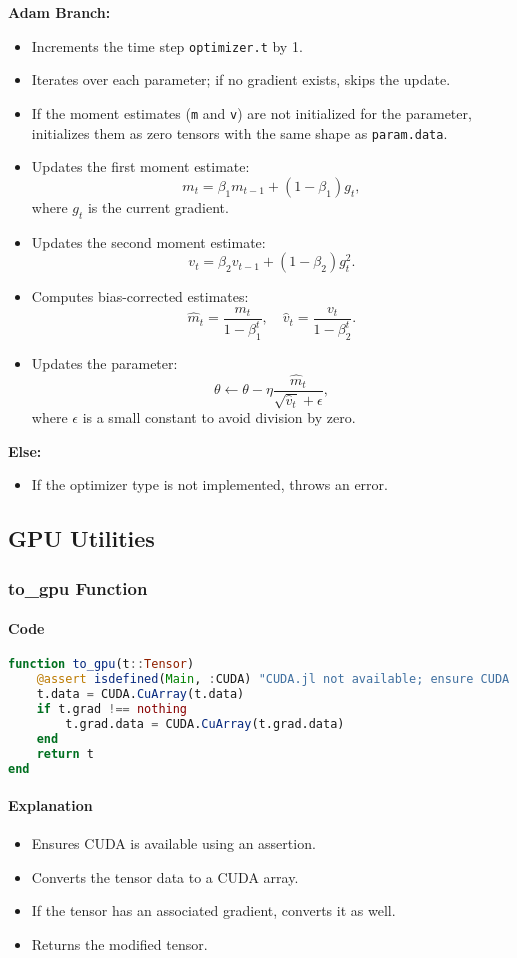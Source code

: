 \documentclass[11pt]{article}
\begin{document}
\textbf{Adam Branch:}
\begin{itemize}
    \item Increments the time step \texttt{optimizer.t} by 1.
    \item Iterates over each parameter; if no gradient exists, skips the update.
    \item If the moment estimates (\texttt{m} and \texttt{v}) are not initialized for the parameter, initializes them as zero tensors with the same shape as \texttt{param.data}.
    \item Updates the first moment estimate:
    \[
    m_t = \beta_1 m_{t-1} + (1 - \beta_1) g_t,
    \]
    where \(g_t\) is the current gradient.
    \item Updates the second moment estimate:
    \[
    v_t = \beta_2 v_{t-1} + (1 - \beta_2) g_t^2.
    \]
    \item Computes bias-corrected estimates:
    \[
    \hat{m}_t = \frac{m_t}{1 - \beta_1^t}, \quad \hat{v}_t = \frac{v_t}{1 - \beta_2^t}.
    \]
    \item Updates the parameter:
    \[
    \theta \leftarrow \theta - \eta \frac{\hat{m}_t}{\sqrt{\hat{v}_t} + \epsilon},
    \]
    where \(\epsilon\) is a small constant to avoid division by zero.
\end{itemize}
\textbf{Else:}
\begin{itemize}
    \item If the optimizer type is not implemented, throws an error.
\end{itemize}

\subsection{GPU Utilities}
\subsubsection{to\_gpu Function}
\paragraph{Code}
\begin{lstlisting}[language=Julia]
function to_gpu(t::Tensor)
    @assert isdefined(Main, :CUDA) "CUDA.jl not available; ensure CUDA is installed."
    t.data = CUDA.CuArray(t.data)
    if t.grad !== nothing
        t.grad.data = CUDA.CuArray(t.grad.data)
    end
    return t
end
\end{lstlisting}

\paragraph{Explanation}
\begin{itemize}
    \item Ensures CUDA is available using an assertion.
    \item Converts the tensor data to a CUDA array.
    \item If the tensor has an associated gradient, converts it as well.
    \item Returns the modified tensor.
\end{itemize}
\end{document}
